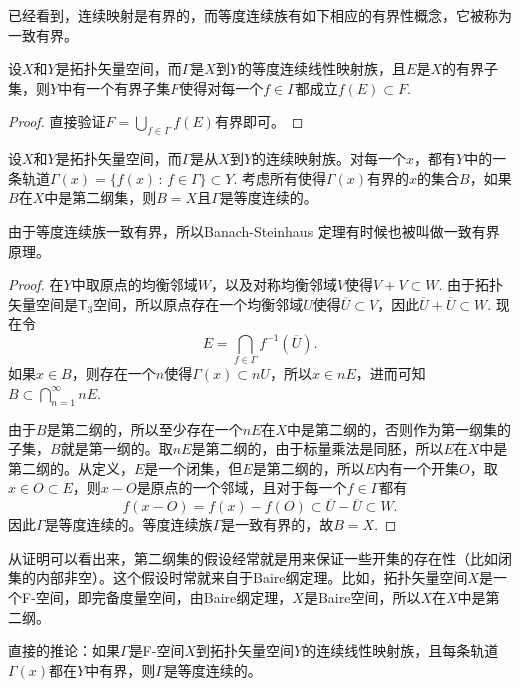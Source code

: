 已经看到，连续映射是有界的，而等度连续族有如下相应的有界性概念，它被称为一致有界。

\begin{pro}
设$X$和$Y$是拓扑矢量空间，而$\Gamma$是$X$到$Y$的等度连续线性映射族，且$E$是$X$的有界子集，则$Y$中有一个有界子集$F$使得对每一个$f\in \Gamma$都成立$f(E)\subset F$.
\end{pro}

\begin{proof}
	直接验证$F=\bigcup_{f\in \Gamma}f(E)$有界即可。
\end{proof}

\begin{thm}
	设$X$和$Y$是拓扑矢量空间，而$\Gamma$是从$X$到$Y$的连续映射族。对每一个$x$，都有$Y$中的一条轨道$\Gamma(x)=\{f(x)\,:\, f\in \Gamma\}\subset Y$. 考虑所有使得$\Gamma(x)$有界的$x$的集合$B$，如果$B$在$X$中是第二纲集，则$B=X$且$\Gamma$是等度连续的。
\end{thm}

由于等度连续族一致有界，所以Banach-Steinhaus 定理有时候也被叫做一致有界原理。

\begin{proof}
	在$Y$中取原点的均衡邻域$W$，以及对称均衡邻域$V$使得$V+V\subset W$. 由于拓扑矢量空间是$\mathsf{T}_3$空间，所以原点存在一个均衡邻域$U$使得$\overline{U}\subset V$，因此$\overline{U}+\overline{U}\subset W$. 现在令
	\[
	E=\bigcap_{f\in \Gamma}f^{-1}(\overline{U}).
	\]
	如果$x\in B$，则存在一个$n$使得$\Gamma(x)\subset nU$，所以$x\in n E$，进而可知$B\subset \bigcap_{n=1}^\infty nE$.

	由于$B$是第二纲的，所以至少存在一个$nE$在$X$中是第二纲的，否则作为第一纲集的子集，$B$就是第一纲的。取$nE$是第二纲的，由于标量乘法是同胚，所以$E$在$X$中是第二纲的。从定义，$E$是一个闭集，但$E$是第二纲的，所以$E$内有一个开集$O$，取$x\in O\subset E$，则$x-O$是原点的一个邻域，且对于每一个$f\in \Gamma$都有
	\[
	f(x-O)=f(x)-f(O)\subset \overline{U}-\overline{U}\subset W.
	\]
	因此$\Gamma$是等度连续的。等度连续族$\Gamma$是一致有界的，故$B=X$.
\end{proof}

从证明可以看出来，第二纲集的假设经常就是用来保证一些开集的存在性（比如闭集的内部非空）。这个假设时常就来自于Baire纲定理。比如，拓扑矢量空间$X$是一个F-空间，即完备度量空间，由Baire纲定理，$X$是Baire空间，所以$X$在$X$中是第二纲。

直接的推论：如果$\Gamma$是F-空间$X$到拓扑矢量空间$Y$的连续线性映射族，且每条轨道$\Gamma(x)$都在$Y$中有界，则$\Gamma$是等度连续的。


